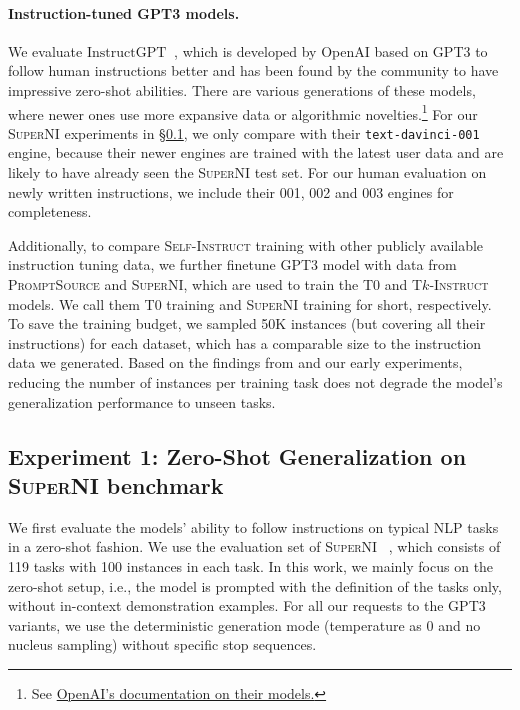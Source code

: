 \paragraph{Instruction-tuned GPT3 models.} We evaluate $\text{InstructGPT}_{\text{}}$~\cite{ouyang2022training}, 
which is developed by OpenAI based on GPT3 to follow human instructions better and has been found by the community to have impressive zero-shot abilities. There are various generations of these models, where newer ones use more expansive data or algorithmic novelties.\footnote{
See \href{https://beta.openai.com/docs/model-index-for-researchers}{OpenAI's documentation on their models.} } For our \textsc{SuperNI} experiments in \S\ref{subsec:superni-experiments}, we only compare with their \texttt{text-davinci-001} engine, because their newer engines are trained with the latest user data and are likely to have already seen the \textsc{SuperNI} test set. For our human evaluation on newly written instructions, we include their 001, 002 and 003 engines for completeness.

Additionally, to compare \textsc{Self-Instruct} training with other publicly available instruction tuning data, we further finetune GPT3 model with data from \textsc{PromptSource} and \textsc{SuperNI}, which are used to train the \textsc{T$0$} and \textsc{T$k$-Instruct} models. We call them \textsc{T$0$} training and \textsc{SuperNI} training for short, respectively. To save the training budget, we sampled 50K instances (but covering all their instructions) for each dataset, which has a comparable size to the instruction data we generated. Based on the findings from \citet{wang2022benchmarking} and our early experiments, reducing the number of instances per training task does not degrade the model's generalization performance to unseen tasks.

\subsection{Experiment 1: Zero-Shot Generalization on \textsc{SuperNI} benchmark}
\label{subsec:superni-experiments}
We first evaluate the models' ability to follow instructions on typical NLP tasks in a zero-shot fashion. We use the evaluation set of \textsc{SuperNI} ~\cite{wang2022benchmarking}, which consists of 119 tasks with 100 instances in each task. In this work, we mainly focus on the zero-shot setup, i.e., the model is prompted with the definition of the tasks only, without in-context demonstration examples. For all our requests to the \textsc{GPT3} variants, we use the deterministic generation mode (temperature as 0 and no nucleus sampling) without specific stop sequences.

